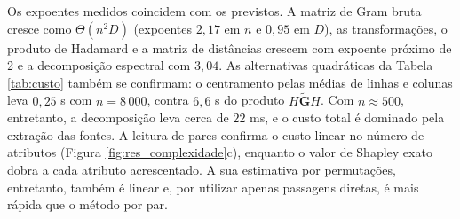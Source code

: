 Os expoentes medidos coincidem com os previstos. A matriz de Gram bruta cresce como $\Theta(n^2 D)$ (expoentes $2{,}17$ em $n$ e $0{,}95$ em $D$), as transformações, o produto de Hadamard e a matriz de distâncias crescem com expoente próximo de 2 e a decomposição espectral com $3{,}04$. As alternativas quadráticas da Tabela \ref{tab:custo} também se confirmam: o centramento pelas médias de linhas e colunas leva $0{,}25$ s com $n = 8\,000$, contra $6{,}6$ s do produto $H\widetilde{\mathbf{G}}H$. Com $n \approx 500$, entretanto, a decomposição leva cerca de $22$ ms, e o custo total é dominado pela extração das fontes. A leitura de pares confirma o custo linear no número de atributos (Figura \ref{fig:res_complexidade}c), enquanto o valor de Shapley exato dobra a cada atributo acrescentado. A sua estimativa por permutações, entretanto, também é linear e, por utilizar apenas passagens diretas, é mais rápida que o método por par.
